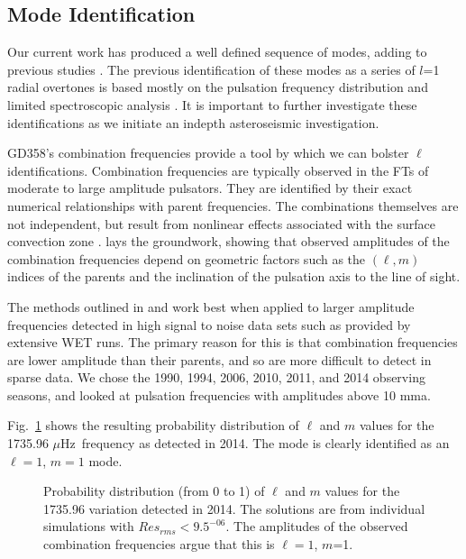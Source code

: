 \documentclass[12pt,preprint]{aastex}
\newcommand{\muHz}{\mbox{$\mu$Hz}}
\begin{document}
\subsection{Mode Identification}\label{mode}
Our current work has produced a well defined sequence of modes, adding to previous studies \citep{Montgomery10, Provencal09, Metcalfe00, Winget94}. The previous identification of these modes as 
a series of $l$=1 radial overtones is based mostly on the pulsation frequency distribution 
and limited spectroscopic analysis \citep{Kotak02, Castanheira05}. It is important to further 
investigate these identifications as we initiate an indepth asteroseismic investigation.  

GD358's combination frequencies provide a tool by which we can bolster $\ell$ identifications. 
Combination frequencies are typically observed in the FTs of moderate to large amplitude pulsators.  
They are identified by their exact numerical relationships with parent frequencies.  
The combinations themselves are not independent, but result from nonlinear effects associated 
with the surface convection zone \citep{Brickhill92, Brassard95, Wu01, Ising01}.  
\citet{Wu01} lays the groundwork, showing that observed amplitudes of the combination 
frequencies depend on geometric factors such as the $(\ell,m)$ indices of the parents and the 
inclination of the pulsation axis to the line of sight.  

The methods outlined in \citet{Provencal12} and \citet{Montgomery10} work best when applied to 
larger amplitude frequencies detected in high signal to noise data sets such as provided by 
extensive WET runs.  The primary reason for this is that combination frequencies are lower 
amplitude than their parents, and so are more difficult to detect in sparse data.  We chose 
the 1990, 1994, 2006, 2010, 2011, and 2014 observing seasons, and looked at pulsation 
frequencies with amplitudes above 10 mma.  

Fig.~\ref{modeamps} shows the resulting probability distribution of $\ell$ and $m$ values for the 1735.96 \muHz\
frequency as detected in 2014. The mode is clearly identified as an $\ell=1$, $m=1$ mode. 

\begin{figure}
 \caption{Probability distribution (from 0 to 1) of $\ell$ and $m$ values for the 1735.96 variation detected in 
 2014.  The solutions are from individual simulations with $Res_{rms}<9.5^{-06}$. The amplitudes of the 
 observed combination frequencies argue that this is $\ell=1$, $m$=1.  
 \label{modeamps}
 }
\end{figure}
\end{document}
